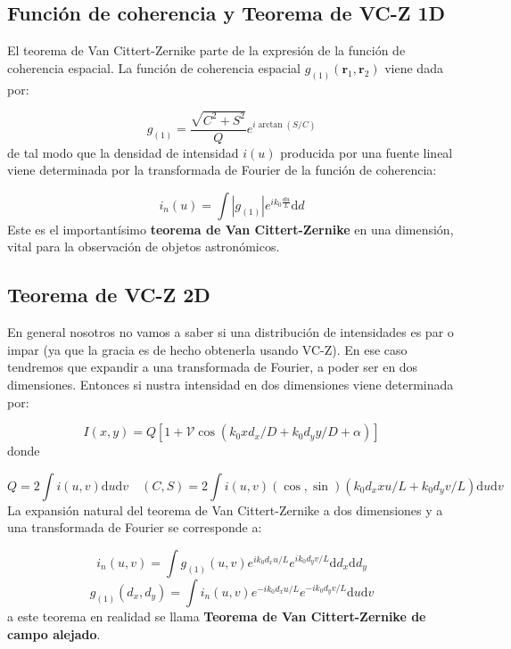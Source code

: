 \documentclass[12pt,a4paper]{book}
\numberwithin{equation}{section}
\numberwithin{figure}{section}
\newcommand{\ccorchetes}[1]{\left[ #1  \right]}
\newcommand{\D}{\mathrm{d}}
\newcommand{\1}{_{(1)}}
\newcommand{\2}{_{(2)}}
\newcommand{\rn}{\mathbf{r}}
\theoremstyle{definition}
\begin{document}
\subsection{Función de coherencia y Teorema de VC-Z 1D} 

El teorema de Van Cittert-Zernike parte de la expresión de la función de coherencia espacial. La función de coherencia espacial $g\1 (\rn_1,\rn_2) $ viene dada por:

\begin{equation}
g\1 = \frac{\sqrt{C^2+S^2}}{Q} e^{i \arctan (S/C)} 
\end{equation}
de tal modo que la densidad de intensidad $i(u)$ producida por una fuente lineal viene determinada por la transformada de Fourier de la función de coherencia:

\begin{equation}
i_n (u) = \int |g\1|e^{ik_0\frac{du}{L}} \D d
\end{equation}
Este es el importantísimo \textbf{teorema de Van Cittert-Zernike} en una dimensión, vital para la observación de objetos astronómicos.

\subsection{Teorema de VC-Z 2D}

En general nosotros no vamos a saber si una distribución de intensidades es par o impar (ya que la gracia es de hecho obtenerla usando VC-Z). En ese caso tendremos que expandir a una transformada de Fourier, a poder ser en dos dimensiones. Entonces si nustra intensidad en dos dimensiones viene determinada por:

\begin{equation}
I(x,y) = Q \ccorchetes{ 1 + \mathcal{V} \cos (k_0 x d_x /D + k_0 d_y y / D + \alpha) }
\end{equation}
donde

\begin{equation}
Q = 2 \int i(u,v) \D u \D v \quad (C,S) = 2  \int i(u,v) (\cos,\sin) (k_0 d_x xu/L + k_0 d_y v / L)\D u \D v
\end{equation}
La expansión natural del teorema de Van Cittert-Zernike a dos dimensiones y a una transformada de Fourier se corresponde a:

\begin{equation}
i_n (u,v) = \int g\1 (u,v) e^{ i k_0 d_x u /L} e^{ i k_0 d_y v/L} \D d_x \D d_y
\end{equation}
\begin{equation}
g\1 (d_x,d_y) = \int  i_n (u,v)e^{ -i k_0 d_x u /L} e^{- i k_0 d_y v/L} \D u \D v
\end{equation}
a este teorema en realidad se llama \textbf{Teorema de Van Cittert-Zernike de campo alejado}. 
\end{document}
